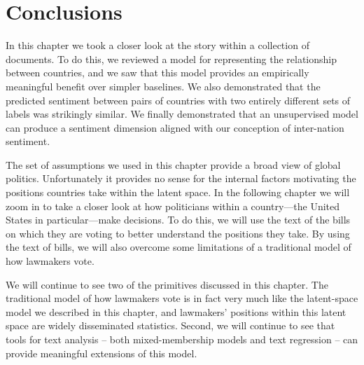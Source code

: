 \section{Conclusions}

In this chapter we took a closer look at the story within a collection
of documents.  To do this, we reviewed a model for representing the
relationship between countries, and we saw that this model provides an
empirically meaningful benefit over simpler baselines.  We also
demonstrated that the predicted sentiment between pairs of countries
with two entirely different sets of labels was strikingly similar.  We
finally demonstrated that an unsupervised model can produce a
sentiment dimension aligned with our conception of inter-nation
sentiment.

The set of assumptions we used in this chapter provide a broad view
of global politics.  Unfortunately it provides no sense for the
internal factors motivating the positions countries take within the
latent space.  In the following chapter we will zoom in to take a
closer look at how politicians within a country---the United States in
particular---make decisions.  To do this, we will use the text of the
bills on which they are voting to better understand the positions they
take.  By using the text of bills, we will also overcome some
limitations of a traditional model of how lawmakers vote.

We will continue to see two of the primitives discussed in this
chapter.  The traditional model of how lawmakers vote is in fact very
much like the latent-space model we described in this chapter, and
lawmakers' positions within this latent space are widely disseminated
statistics. Second, we will continue to see that tools for text
analysis -- both mixed-membership models and text regression -- can
provide meaningful extensions of this model.
